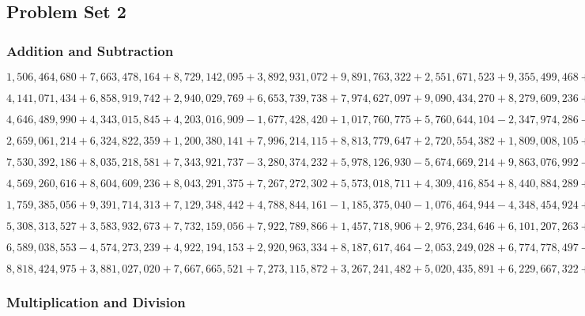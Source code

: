 \hypertarget{problem-set-2-6}{%
\subsection{Problem Set 2}\label{problem-set-2-6}}

\hypertarget{addition-and-subtraction-382}{%
\subsubsection{Addition and
Subtraction}\label{addition-and-subtraction-382}}

\(1,506,464,680+7,663,478,164+8,729,142,095+3,892,931,072+9,891,763,322+2,551,671,523+9,355,499,468+6,084,160,274+2,405,661,887+4,510,918,516\)

\(4,141,071,434+6,858,919,742+2,940,029,769+6,653,739,738+7,974,627,097+9,090,434,270+8,279,609,236+6,951,590,852+8,659,185,587+5,678,782,170\)

\(4,646,489,990+4,343,015,845+4,203,016,909-1,677,428,420+1,017,760,775+5,760,644,104-2,347,974,286-9,499,729,910+4,636,587,673-4,847,742,797\)

\(2,659,061,214+6,324,822,359+1,200,380,141+7,996,214,115+8,813,779,647+2,720,554,382+1,809,008,105+2,165,794,471+4,428,242,945+4,799,783,132\)

\(7,530,392,186+8,035,218,581+7,343,921,737-3,280,374,232+5,978,126,930-5,674,669,214+9,863,076,992-5,578,241,307-2,306,309,723+9,001,065,647\)

\(4,569,260,616+8,604,609,236+8,043,291,375+7,267,272,302+5,573,018,711+4,309,416,854+8,440,884,289+3,636,484,663+4,412,184,383+7,933,653,360\)

\(1,759,385,056+9,391,714,313+7,129,348,442+4,788,844,161-1,185,375,040-1,076,464,944-4,348,454,924+7,396,486,953+4,924,853,907-7,117,058,519\)

\(5,308,313,527+3,583,932,673+7,732,159,056+7,922,789,866+1,457,718,906+2,976,234,646+6,101,207,263+1,342,131,243+9,986,752,746+4,046,948,310\)

\(6,589,038,553-4,574,273,239+4,922,194,153+2,920,963,334+8,187,617,464-2,053,249,028+6,774,778,497-9,288,895,467+3,944,242,084-8,699,723,918\)

\(8,818,424,975+3,881,027,020+7,667,665,521+7,273,115,872+3,267,241,482+5,020,435,891+6,229,667,322+4,799,377,883+1,041,964,804+7,124,190,077\)

\hypertarget{multiplication-and-division-380}{%
\subsubsection{Multiplication and
Division}\label{multiplication-and-division-380}}

